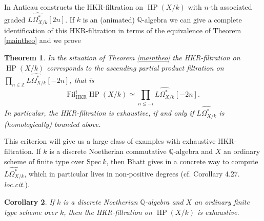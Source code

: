 \documentclass[10pt, reqno]{amsart}
\newtheorem{theorem}{Theorem}[section]
\newtheorem{corollary}[theorem]{Corollary}
\theoremstyle{definition}
\theoremstyle{remark}
\newcommand{\Q}{\mathbb{Q}}
\newcommand{\Z}{\mathbb{Z}}
\newcommand{\dr}[3]{\Omega^{#3}_{#1/#2}}
\newcommand{\Spec}{\mathrm{Spec}}
\newcommand{\Fil}{\mathrm{Fil}}
\newcommand{\HKR}{\mathrm{HKR}}
\DeclareMathOperator{\HP}{\mathrm{HP}}
\begin{document}
In \cite{Ant19} Antieau constructs the HKR-filtration on $\HP(X/k)$ with $n$-th associated graded $\widehat{L\dr Xk*}[2n]$.
If $k$ is an (animated) $\Q$-algebra we can give a complete identification of this HKR-filtration in terms of the equivalence of Theorem \ref{maintheo} and we prove

\begin{theorem}\label{HKR-filtration}
	In the situation of Theorem \ref{maintheo} the HKR-filtration on $\HP(X/k)$ corresponds to the ascending partial product filtration on $\prod_{n\in\Z}\widehat{L\dr Xk*}[-2n]$, that is
	\[\Fil_\HKR^i\HP(X/k)\simeq\prod_{n\leq -i}\widehat{L\dr Xk*}[-2n].\]
	In particular, the HKR-filtration is exhaustive, if and only if $\widehat{L\dr Xk*}$ is (homologically) bounded above.
\end{theorem}

This criterion will give us a large class of examples with exhaustive HKR-filtration. If $k$ is a discrete Noetherian commutative $\Q$-algebra and $X$ an ordinary scheme of finite type over $\Spec\ k$, then Bhatt gives in \cite{Bha12} a concrete way to compute $\widehat{L\dr Xk*}$, which in particular lives in non-positive degrees (cf. Corollary 4.27. \textit{loc.cit.}).

\begin{corollary}\label{Bhatt}
	If $k$ is a discrete Noetherian $\Q$-algebra and $X$ an ordinary finite type scheme over $k$, then the HKR-filtration on $\HP(X/k)$ is exhaustive.
\end{corollary}
\end{document}
